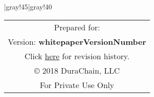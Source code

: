 \def\whitepaperVersionNumber{unknown revision}
\vfill
\begin{center}
\tabulinesep=2mm
  \taburulecolor |{gray!45}|{gray!40} \arrayrulewidth=1pt
\begin{tabu}{||c||}
  \hline \hline
  Prepared for: \\
  \small{Version:} \textbf{whitepaperVersionNumber} \\
	\small
  Click {\href{https://github.com/durachain/whitepaper/commits/master}{here} for revision history.} \\
  \copyright\hspace{.25em} 2018 DuraChain, LLC\\
  For Private Use Only \\ \hline \hline
\end{tabu}

\end{center}
\vfill
